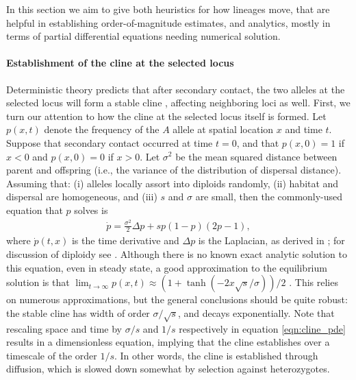 \documentclass[11pt,letterpaper]{article}
\newcommand{\alisa}[1]{{\em \color{red} #1}}
\newcommand{\plr}[1]{{\em \color{blue} #1}}
\begin{document}
In this section we aim to give both heuristics for how lineages move, 
that are helpful in establishing order-of-magnitude estimates,
and analytics, mostly in terms of partial differential equations needing numerical solution.

\paragraph{Establishment of the cline at the selected locus}
Deterministic theory predicts that after secondary contact,
the two alleles at the selected locus will form a stable cline \citep{Barton1979},
affecting neighboring loci as well.
First, we turn our attention to how the cline at the selected locus itself is formed.
Let $p(x,t)$ denote the frequency of the $A$ allele at spatial location $x$ and time $t$.  
Suppose that secondary contact occurred at time $t=0$, 
and that $p(x,0) = 1$ if $x<0$ and $p(x,0)=0$ if $x>0$.
Let $\sigma^2$ be the mean squared distance between parent and offspring 
(i.e., the variance of the distribution of dispersal distance).
Assuming that: (i) alleles locally assort into diploids randomly, 
(ii) habitat and dispersal are homogeneous, and 
(iii) $s$ and $\sigma$ are small, then the commonly-used equation that $p$ solves is
\begin{align} \label{eqn:cline_pde}
    \dot p = \frac{\sigma^2}{2} \Delta p + s p (1-p) (2p-1) ,
\end{align}
where $\dot p(t,x)$ is the time derivative and $\Delta p$ is the Laplacian,
as derived in \citet{Bazykin1969}; for discussion of diploidy see \citep{christiansen1995genotypic}.
Although there is no known exact analytic solution to this equation, even in steady state, 
a good approximation to the equilibrium solution is that
$\lim_{t \to \infty} p(x,t) \approx (1+\tanh(-2x\sqrt{s}/\sigma))/2$ \citep{Bazykin1969}. 
This relies on numerous approximations, but the general conclusions should be quite robust: 
the stable cline has width of order $\sigma/\sqrt{s}$, and decays exponentially. 
Note that rescaling space and time by $\sigma/s$ and $1/s$ respectively in equation \eqref{eqn:cline_pde} results in a dimensionless equation,
implying that the cline establishes over a timescale of the order $1/s$. 
In other words, the cline is established through diffusion, which is slowed down somewhat by selection against heterozygotes. 
\end{document}
